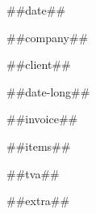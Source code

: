 \documentclass[a4paper, 12pt]{article}
\begin{document}
	\begin{flushright}
		##date##
	\end{flushright}

	##company##
	
	\begin{flushright}
		##client##
	\end{flushright}

	\begin{flushright}
		##date-long##
	\end{flushright}

	##invoice##
	
	##items##
	
	\begin{flushright}
		##tva##
	\end{flushright}

	##extra##
\end{document}
